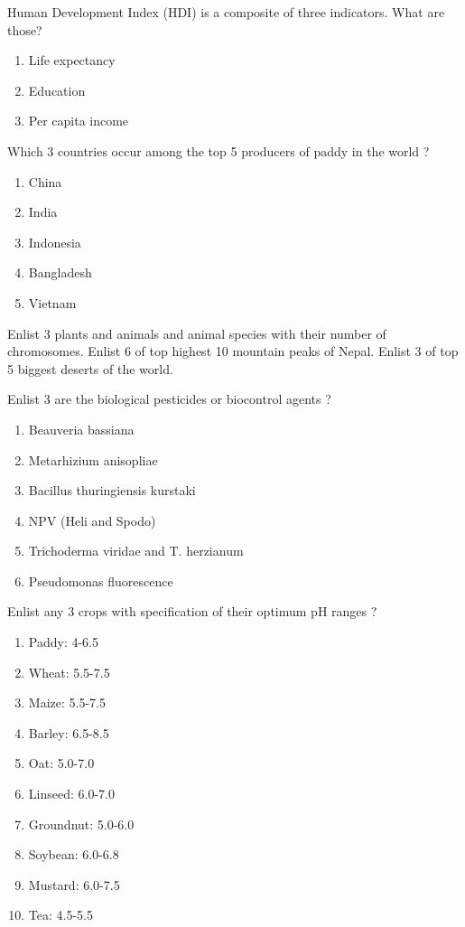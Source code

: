 \documentclass[10pt,a4paper]{exam}
\begin{document}
\begin{questions}

\question Human Development Index (HDI) is a composite of three indicators. What are those?

\begin{solution}
\begin{enumerate}
\item Life expectancy
\item Education
\item Per capita income
\end{enumerate}
\end{solution}

\question Which 3 countries occur among the top 5 producers of paddy in the world ?
  \begin{solution}
  \begin{enumerate}
  \item China
  \item India
  \item Indonesia
  \item Bangladesh
  \item Vietnam
  \end{enumerate}
  \end{solution}

\question Enlist 3 plants and animals and animal species with their number of chromosomes.
\question	Enlist 6 of top highest 10 mountain peaks of Nepal.
\question Enlist 3 of top 5 biggest deserts of the world.

\question Enlist 3 are the biological pesticides or biocontrol agents ?
  \begin{solution}
  \begin{enumerate}
  \item Beauveria bassiana
  \item Metarhizium anisopliae
  \item Bacillus thuringiensis kurstaki
  \item NPV (Heli and Spodo)
  \item Trichoderma viridae and T. herzianum
  \item Pseudomonas fluorescence
  \end{enumerate}
  \end{solution}

\question Enlist any 3 crops with specification of their optimum pH ranges ?
  \begin{solution}
  \begin{enumerate}
  \item Paddy: 4-6.5
  \item Wheat: 5.5-7.5
  \item Maize: 5.5-7.5
  \item Barley: 6.5-8.5
  \item Oat: 5.0-7.0
  \item Linseed: 6.0-7.0
  \item Groundnut: 5.0-6.0
  \item Soybean: 6.0-6.8
  \item Mustard: 6.0-7.5
  \item Tea: 4.5-5.5
  \end{enumerate}
  \end{solution}


\end{questions}
\end{document}
